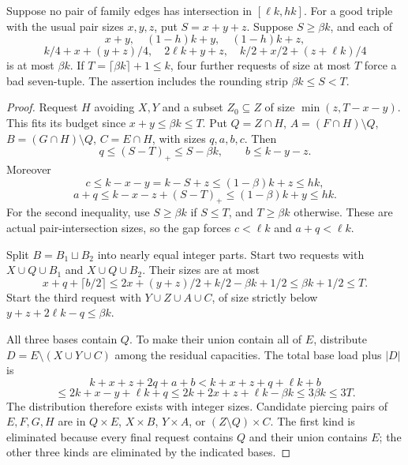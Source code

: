 \begin{lemma}\label{lem:gapsurvive}
Suppose no pair of family edges has intersection in $[\ell k,hk]$. For a good triple with the usual pair sizes $x,y,z$, put $S=x+y+z$. Suppose $S\ge\beta k$, and each of
\[
x+y,\quad (1-h)k+y,\quad (1-h)k+z,
\]
\[
k/4+x+(y+z)/4,\quad 2\ell k+y+z,\quad k/2+x/2+(z+\ell k)/4
\]
is at most $\beta k$. If $T=\lceil\beta k\rceil+1\le k$, four further requests of size at most $T$ force a bad seven-tuple. The assertion includes the rounding strip $\beta k\le S<T$.
\end{lemma}
\begin{proof}
Request $H$ avoiding $X,Y$ and a subset $Z_0\subseteq Z$ of size $\min(z,T-x-y)$. This fits its budget since $x+y\le\beta k\le T$. Put $Q=Z\cap H$, $A=(F\cap H)\setminus Q$, $B=(G\cap H)\setminus Q$, $C=E\cap H$, with sizes $q,a,b,c$. Then
\[
q\le(S-T)_+\le S-\beta k,\qquad b\le k-y-z.
\]
Moreover
\[
c\le k-x-y=k-S+z\le(1-\beta)k+z\le hk,
\]
\[
a+q\le k-x-z+(S-T)_+\le(1-\beta)k+y\le hk.
\]
For the second inequality, use $S\ge\beta k$ if $S\le T$, and $T\ge\beta k$ otherwise. These are actual pair-intersection sizes, so the gap forces $c<\ell k$ and $a+q<\ell k$.

Split $B=B_1\sqcup B_2$ into nearly equal integer parts. Start two requests with $X\cup Q\cup B_1$ and $X\cup Q\cup B_2$. Their sizes are at most
\[
x+q+\lceil b/2\rceil\le2x+(y+z)/2+k/2-\beta k+1/2\le\beta k+1/2\le T.
\]
Start the third request with $Y\cup Z\cup A\cup C$, of size strictly below $y+z+2\ell k-q\le\beta k$.

All three bases contain $Q$. To make their union contain all of $E$, distribute $D=E\setminus(X\cup Y\cup C)$ among the residual capacities. The total base load plus $|D|$ is
\[
k+x+z+2q+a+b<k+x+z+q+\ell k+b
\]
\[
\le2k+x-y+\ell k+q\le2k+2x+z+\ell k-\beta k\le3\beta k\le3T.
\]
The distribution therefore exists with integer sizes. Candidate piercing pairs of $E,F,G,H$ are in $Q\times E$, $X\times B$, $Y\times A$, or $(Z\setminus Q)\times C$. The first kind is eliminated because every final request contains $Q$ and their union contains $E$; the other three kinds are eliminated by the indicated bases.
\end{proof}

